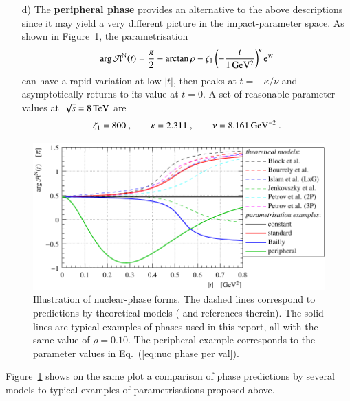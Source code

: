 \begin{enumerate}
\item[d)]
The {\bf peripheral phase} \cite{kl94} provides an alternative to the above descriptions since it may yield a very different picture in the impact-parameter space. As shown in Figure~\ref{fig:phase illustration}, the parametrisation
\begin{equation}
\label{eq:nuc phase per}
\arg {\cal A}^{\rm N}(t) = {\pi\over 2} - \arctan\rho - \zeta_1 \left(- {t\over 1\un{GeV^2}} \right)^\kappa \e^{\nu t}
\end{equation}
can have a rapid variation at low $|t|$, then peaks at $t = -\kappa / \nu$ and asymptotically returns to its value at $t=0$. A set of reasonable parameter values at $\sqrt s = 8\,{\rm TeV}$ are
\begin{equation}
\label{eq:nuc phase per val}
	\zeta_1 = 800\ ,\qquad
	\kappa = 2.311\ ,\qquad
	\nu = 8.161\,{\rm GeV^{-2}}\ .
\end{equation}
\end{enumerate}

\begin{figure}
\begin{center}
\includegraphics{fig/hadronic_phase_illustration.pdf}
\caption{Illustration of nuclear-phase forms. The dashed lines correspond to predictions by theoretical models (\cite{elegent} and references therein). The solid lines are typical examples of phases used in this report, all with the same value of $\rho = 0.10$. The peripheral example corresponds to the parameter values in Eq.~(\ref{eq:nuc phase per val}).
}
\label{fig:phase illustration}
\end{center}
\end{figure}


Figure~\ref{fig:phase illustration} shows on the same plot a comparison of phase predictions by several models to typical examples of parametrisations proposed above.


